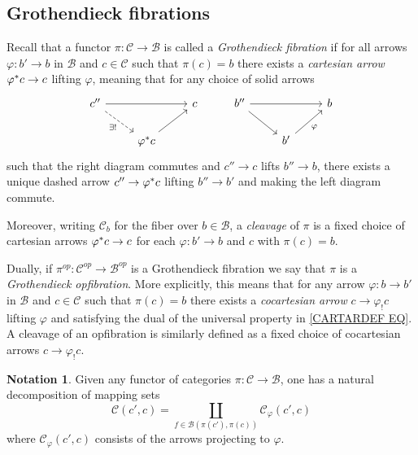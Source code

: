 \documentclass[a4paper,10pt
,draft
]{article}%
\numberwithin{equation}{section}
\numberwithin{figure}{section}
\theoremstyle{definition} %
\newtheorem{notation}[equation]{Notation}%
\newcommand{\1}{\ensuremath{\mathbbm 1}}%
\begin{document}
\subsection{Grothendieck fibrations}



Recall that a functor 
$\pi \colon \mathcal{C} \to \mathcal{B}$
is called a \emph{Grothendieck fibration}
if for all arrows
$\varphi \colon b' \to b$ in $\mathcal{B}$
and $c \in \mathcal{C}$ such that $\pi(c) = b$
there exists a \emph{cartesian arrow}
$\varphi^{\**}c \to c$
lifting $\varphi$,
meaning that for any choice of solid arrows
\begin{equation}\label{CARTARDEF EQ}
\begin{tikzcd}
c'' \ar{rr} \ar[dashed]{rd}[swap]{\exists!} 
&&
c
&%
b'' \ar{rr} \ar{rd} 
&&
b
\\
& \varphi^{\**} c \ar{ru}
&
&%
& b'\ar{ru}[swap]{\varphi}
&
\end{tikzcd}
\end{equation}
such that the right diagram commutes and 
$c'' \to c$ lifts $b'' \to b$,
there exists a unique dashed arrow
$c'' \to \varphi^{\**} c$ lifting $b'' \to b'$
and making the left diagram commute.


Moreover, writing $\mathcal{C}_b$ for the fiber over $b \in \mathcal{B}$,
a \emph{cleavage} of $\pi$ is a fixed choice of cartesian arrows
$\varphi^{\**} c \to c$
for each $\varphi \colon b' \to b$ and $c$ with $\pi(c)=b$.


Dually, if $\pi^{op} \colon \mathcal{C}^{op} \to \mathcal{B}^{op}$
is a Grothendieck fibration we 
say that $\pi$ is a \emph{Grothendieck opfibration}.
More explicitly, this means that for any arrow
$\varphi \colon b \to b'$ in $\mathcal{B}$
and $c \in \mathcal{C}$ such that 
$\pi(c) = b$ there exists a 
\emph{cocartesian arrow}
$c \to \varphi_! c$ lifting $\varphi$
and satisfying the dual of the universal property in 
\eqref{CARTARDEF EQ}.
A cleavage of an opfibration is similarly defined as a fixed choice
of cocartesian arrows 
$c \to \varphi_!c$.



\begin{notation}\label{MAPSDEC NOT}
Given any functor of categories
$\pi \colon \mathcal{C} \to \mathcal{B}$,
one has a natural decomposition of mapping sets
\begin{equation}
\mathcal{C}(c',c) = 
\coprod_{f \in \mathcal{B}(\pi(c'),\pi(c))}
 \mathcal{C}_{\varphi}\left(c',c \right)
\end{equation}
where $\mathcal{C}_{\varphi}\left(c',c \right)$ consists of the arrows projecting to $\varphi$.
\end{notation}
\end{document}

